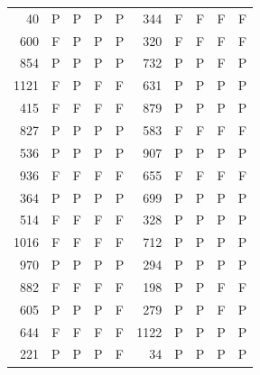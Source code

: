 \begin{table}[htbp]
\begin{tabular*}{\linewidth}{@{\extracolsep{\fill}}rccccrcccc}
40 & P & P & P & P & 344 & F & F & F & F\\
600 & F & P & P & P & 320 & F & F & F & F\\
854 & P & P & P & P & 732 & P & P & F & P\\
1121 & F & P & F & F & 631 & P & P & P & P\\
415 & F & F & F & F & 879 & P & P & P & P\\
827 & P & P & P & P & 583 & F & F & F & F\\
536 & P & P & P & P & 907 & P & P & P & P\\
936 & F & F & F & F & 655 & F & F & F & F\\
364 & P & P & P & P & 699 & P & P & P & P\\
514 & F & F & F & F & 328 & P & P & P & P\\
1016 & F & F & F & F & 712 & P & P & P & P\\
970 & P & P & P & P & 294 & P & P & P & P\\
882 & F & F & F & F & 198 & P & P & F & F\\
605 & P & P & P & F & 279 & P & P & F & P\\
644 & F & F & F & F & 1122 & P & P & P & P\\
221 & P & P & P & F & 34 & P & P & P & P\\
\bottomrule\end{tabular*}\end{table}
